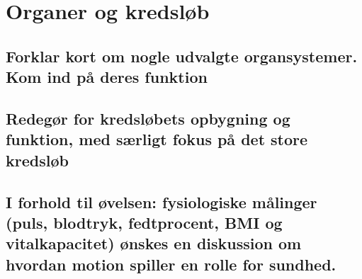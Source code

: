\newpage
\section{Organer og kredsløb}
\subsection{Forklar kort om nogle udvalgte organsystemer. Kom ind på deres funktion}
\subsection{Redegør for kredsløbets opbygning og funktion, med særligt fokus på det store kredsløb}
\subsection{I forhold til øvelsen: fysiologiske målinger (puls, blodtryk, fedtprocent, BMI og vitalkapacitet) ønskes en diskussion om hvordan motion spiller en rolle for sundhed.}